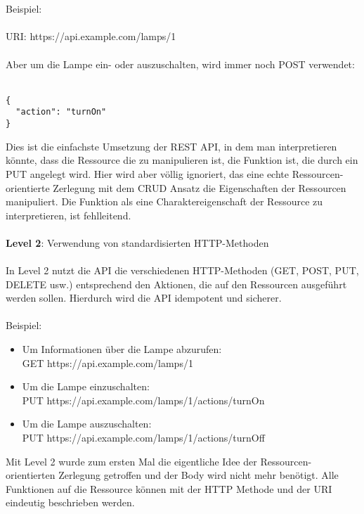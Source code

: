 \documentclass[../vs-script-first-v01.tex]{subfiles}
\begin{document}
\\\\
Beispiel:
\\\\
URI: https://api.example.com/lamps/1
\\\\
Aber um die Lampe ein- oder auszuschalten, wird immer noch POST verwendet:
\\\\
\noindent\begin{minipage}{\textwidth}
\begin{lstlisting}[caption={Level 1},captionpos=b,label={lst:level_1}]
{
  "action": "turnOn"
}
\end{lstlisting}
\end{minipage}
Dies ist die einfachste Umsetzung der REST API, in dem man interpretieren könnte, dass die Ressource die zu manipulieren ist, die Funktion ist, die durch ein PUT angelegt wird. Hier wird aber völlig ignoriert, das eine echte Ressourcen-orientierte Zerlegung mit dem CRUD Ansatz die Eigenschaften der Ressourcen manipuliert. Die Funktion als eine Charaktereigenschaft der Ressource zu interpretieren, ist fehlleitend. 
\\\\
\textbf{Level 2}: Verwendung von standardisierten HTTP-Methoden
\\\\
In Level 2 nutzt die API die verschiedenen HTTP-Methoden (GET, POST, PUT, DELETE usw.) entsprechend den Aktionen, die auf den Ressourcen ausgeführt werden sollen. Hierdurch wird die API idempotent und sicherer.
\\\\
Beispiel:
\begin{itemize}
\item Um Informationen über die Lampe abzurufen:\\ 
GET https://api.example.com/lamps/1
\item  Um die Lampe einzuschalten:\\ PUT https://api.example.com/lamps/1/actions/turnOn
\item Um die Lampe auszuschalten:\\ PUT https://api.example.com/lamps/1/actions/turnOff
\end{itemize}
Mit Level 2 wurde zum ersten Mal die eigentliche Idee der Ressourcen-orientierten Zerlegung getroffen und der Body wird nicht mehr benötigt. Alle Funktionen auf die Ressource können mit der HTTP Methode und der URI eindeutig beschrieben werden. 
\end{document}
